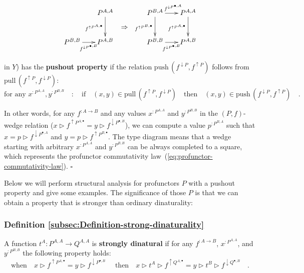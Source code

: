 \begin{wrapfigure}{l}{0.41\columnwidth}%
\vspace{-2\baselineskip}
\[
\xymatrix{\xyScaleY{2.3pc}\xyScaleX{1.5pc} & P^{A,A}\ar[d]\sb(0.5){f^{\uparrow P^{A,\bullet}}} & \ar@{}[d]\sb(0.5){\displaystyle \Rightarrow} & P^{B,A}\ar[r]\sp(0.55){f^{\downarrow P^{\bullet,A}}}\ar[d]\sb(0.5){f^{\uparrow P^{B,\bullet}}} & P^{A,A}\ar[d]\sb(0.5){f^{\uparrow P^{A,\bullet}}}\\
P^{B,B}\ar[r]\sb(0.5){f^{\downarrow P^{\bullet,B}}} & P^{A,B} &  & P^{B,B}\ar[r]\sb(0.5){f^{\downarrow P^{\bullet,B}}} & P^{A,B}
}
\]

\vspace{-2\baselineskip}
\end{wrapfigure}%

\noindent in $Y$) has the \textbf{pushout property}
if the relation $\text{push}\,(f^{\downarrow P},f^{\uparrow P})$
follows from $\text{pull}\,(f^{\uparrow P},f^{\downarrow P})$:
\[
\text{for any }x^{:P^{A,A}},y^{:P^{B,B}}\quad:\quad\text{if}\quad(x,y)\in\text{pull}\,(f^{\uparrow P},f^{\downarrow P})\quad\text{then}\quad(x,y)\in\text{push}\,(f^{\downarrow P},f^{\uparrow P})\quad.
\]

\noindent In other words, for any $f^{:A\rightarrow B}$ and any values
$x^{:P^{A,A}}$ and $y^{:P^{B,B}}$ in the $\left(P,f\right)$-wedge
relation ($x\triangleright f^{\uparrow P^{A,\bullet}}=y\triangleright f^{\downarrow P^{\bullet,B}}$),
we can compute a value $p^{:P^{B,A}}$ such that $x=p\triangleright f^{\downarrow P^{\bullet,A}}$
and $y=p\triangleright f^{\uparrow P^{B,\bullet}}$. The type diagram
means that a wedge starting with arbitrary $x^{:P^{A,A}}$ and $y^{:P^{B,B}}$
can be always completed to a square, which represents the profunctor
commutativity law~(\ref{eq:profunctor-commutativity-law}). $\square$

Below we will perform structural analysis for profunctors $P$ with
a pushout property and give some examples. The significance of those
$P$ is that we can obtain a property that is stronger than ordinary
dinaturality:

\subsubsection{Definition \label{subsec:Definition-strong-dinaturality}\ref{subsec:Definition-strong-dinaturality}}

A function $t^{A}:P^{A,A}\rightarrow Q^{A,A}$ is \textbf{strongly
dinatural} if for any $f^{:A\rightarrow B}$,
$x^{:P^{A,A}}$, and $y^{:P^{B,B}}$ the following property holds:\vspace{-0.3\baselineskip}
\begin{equation}
\text{when}\quad x\triangleright f^{\uparrow P^{A,\bullet}}=y\triangleright f^{\downarrow P^{\bullet,B}}\quad\text{ then}\quad x\triangleright t^{A}\triangleright f^{\uparrow Q^{A,\bullet}}=y\triangleright t^{B}\triangleright f^{\downarrow Q^{\bullet,B}}\quad.\label{eq:strong-dinaturality-law}
\end{equation}

